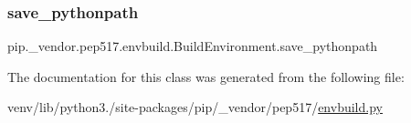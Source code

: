 \subsubsection{\texorpdfstring{save\+\_\+pythonpath}{save\_pythonpath}}
{\footnotesize\ttfamily pip.\+\_\+vendor.\+pep517.\+envbuild.\+Build\+Environment.\+save\+\_\+pythonpath}



The documentation for this class was generated from the following file\+:\begin{DoxyCompactItemize}
\item 
venv/lib/python3./site-\/packages/pip/\+\_\+vendor/pep517/\hyperlink{envbuild_8py}{envbuild.\+py}\end{DoxyCompactItemize}
